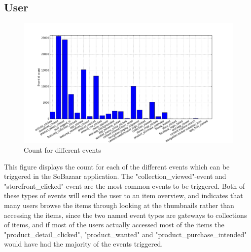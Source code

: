 \subsection{User}
    \begin{figure}[H]
        \includegraphics[width=5in]{image/event_iddistribution.png}
        \centering
        \caption{Count for different events}
    \label{figure:eventIDDistribution}
    \end{figure}
        This figure displays the count for each of the different events which can be triggered in the SoBazaar application.
        The "collection\_viewed"-event and "storefront\_clicked"-event are the most common events to be triggered.
        Both of these types of events will send the user to an item overview, and indicates that many users browse the items through looking at the thumbnails rather than accessing the items, since the two named event types are gateways to collections of items, and if most of the users actually accessed most of the items the "product\_detail\_clicked", "product\_wanted" and "product\_purchase\_intended" would have had the majority of the events triggered.

